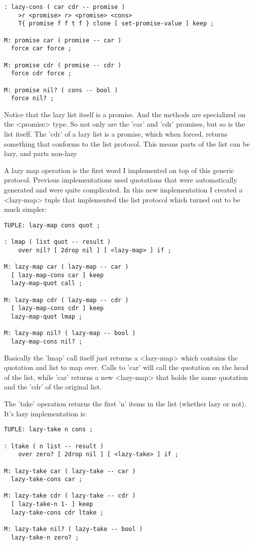\begin{verbatim}
: lazy-cons ( car cdr -- promise ) 
    >r <promise> r> <promise> <cons> 
    T{ promise f f t f } clone [ set-promise-value ] keep ;

M: promise car ( promise -- car )
  force car force ;

M: promise cdr ( promise -- cdr )
  force cdr force ;

M: promise nil? ( cons -- bool )
  force nil? ;
\end{verbatim}


Notice that the lazy list itself is a promise. And the methods are
specialized on the <promise> type. So not only are the 'car' and 'cdr'
promises, but so is the list itself. The 'cdr' of a lazy list is a
promise, which when forced, returns something that conforms to the
list protocol. This means parts of the list can be lazy, and parts
non-lazy

A lazy map operation is the first word I implemented on top of this
generic protocol. Previous implementations used quotations that were
automatically generated and were quite complicated. In this new
implementation I created a <lazy-map> tuple that implemented the list
protocol which turned out to be much simpler:

\begin{verbatim}
TUPLE: lazy-map cons quot ;

: lmap ( list quot -- result )
    over nil? [ 2drop nil ] [ <lazy-map> ] if ;

M: lazy-map car ( lazy-map -- car )
  [ lazy-map-cons car ] keep
  lazy-map-quot call ;

M: lazy-map cdr ( lazy-map -- cdr )
  [ lazy-map-cons cdr ] keep
  lazy-map-quot lmap ;

M: lazy-map nil? ( lazy-map -- bool )
  lazy-map-cons nil? ;
\end{verbatim}


Basically the 'lmap' call itself just returns a <lazy-map> which contains the quotation and list to map over. Calls to 'car' will call the quotation on the head of the list, while 'car' returns a new <lazy-map> that holds the same quotation and the 'cdr' of the original list.

The 'take' operation returns the first 'n' items in the list (whether
lazy or not). It's lazy implementation is:

\begin{verbatim}
TUPLE: lazy-take n cons ;

: ltake ( n list -- result )
    over zero? [ 2drop nil ] [ <lazy-take> ] if ;
     
M: lazy-take car ( lazy-take -- car )
  lazy-take-cons car ;

M: lazy-take cdr ( lazy-take -- cdr )
  [ lazy-take-n 1- ] keep
  lazy-take-cons cdr ltake ;

M: lazy-take nil? ( lazy-take -- bool )
  lazy-take-n zero? ;
\end{verbatim}


